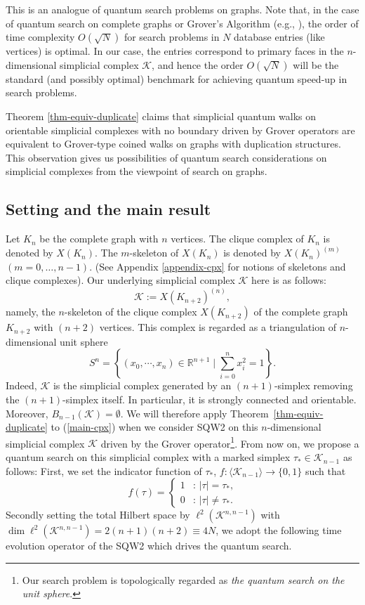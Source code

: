 \documentclass[a4paper,12pt]{article}
\numberwithin{equation}{section}
\begin{document}
This is an analogue of quantum search problems on graphs.
Note that, in the case of quantum search on complete graphs or Grover's Algorithm (e.g., \cite{P2013}), the order of time complexity $O(\sqrt{N})$ for search problems in $N$ database entries (like vertices) is optimal.
In our case, the entries correspond to primary faces in the $n$-dimensional simplicial complex $\mathcal{K}$, and hence the order $O(\sqrt{N})$ will be the standard (and possibly optimal) benchmark for achieving quantum speed-up in search problems.
\par
Theorem \ref{thm-equiv-duplicate} claims that simplicial quantum walks on orientable simplicial complexes with no boundary driven by Grover operators are equivalent to Grover-type coined walks on graphs with duplication structures.
This observation gives us possibilities of quantum search considerations on simplicial complexes from the viewpoint of search on graphs.

\subsection{Setting and the main result}
Let $K_n$ be the complete graph with $n$ vertices. The clique complex of $K_n$ is denoted by $X(K_n)$. The $m$-skeleton of $X(K_n)$ is denoted by $X(K_n)^{(m)}$ $(m=0,\dots,n-1)$.  (See Appendix \ref{appendix-cpx} for notions of skeletons and clique complexes).
Our underlying simplicial complex $\mathcal{K}$ here is as follows:
\begin{equation}
\label{main-cpx}
\mathcal{K} := X(K_{n+2})^{(n)},
\end{equation}
namely, the $n$-skeleton of the clique complex $X(K_{n+2})$ of the complete graph $K_{n+2}$ with $(n+2)$ vertices.
This complex is regarded as a triangulation of $n$-dimensional unit sphere 
\begin{equation*}
S^n = \left\{(x_0, \cdots, x_n)\in \mathbb{R}^{n+1} \mid \sum_{i=0}^n x_i^2 = 1\right\}.
\end{equation*}
Indeed, $\mathcal{K}$ is the simplicial complex generated by an $(n+1)$-simplex removing the $(n+1)$-simplex itself.
In particular, it is strongly connected and orientable. 
Moreover, $B_{n-1}(\mathcal{K}) = \emptyset$.
We will therefore apply Theorem~\ref{thm-equiv-duplicate} to (\ref{main-cpx}) when we consider SQW2 on this $n$-dimensional simplicial complex $\mathcal{K}$ driven by the Grover operator\footnote{
Our search problem is topologically regarded as {\em the quantum search on the unit sphere}.
}.
From now on, we propose a quantum search on this simplicial complex with a marked simplex $\tau_*\in \mathcal{K}_{n-1}$ as follows: 
First, we set the indicator function of $\tau_*$, $f:\langle \mathcal{K}_{n-1} \rangle\to \{0,1\}$ such that
	\[ f(\tau)=\begin{cases} 1 & \text{: $|\tau|=\tau_*$,} \\ 0 & \text{: $|\tau|\neq \tau_*$.} \end{cases} \]
Secondly setting the total Hilbert space by $\ell^2(\mathcal{K}^{n,n-1})$ with $\dim \ell^2(\mathcal{K}^{n,n-1})=2(n+1)(n+2)\equiv 4N$, 
we adopt the following time evolution operator of the SQW2 which drives the quantum search. 
\end{document}

